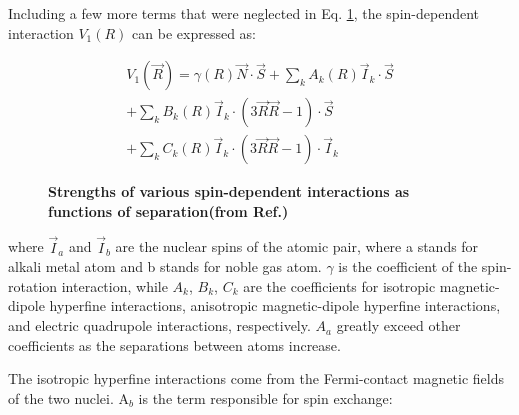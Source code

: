 Including a few more terms that were neglected in Eq. \ref{V1}, the spin-dependent interaction $V_{1}(R)$ can be expressed as:

\begin{equation}
\begin{split}
V_{1}(\vec{R})=\gamma(R)\vec{N}\cdot \vec{S}+\sum_{k}A_{k}(R)\vec{I}_{k}\cdot \vec{S}\\
+\sum_{k}B_{k}(R)\vec{I}_{k}\cdot (3\vec{R}\vec{R}-1)\cdot \vec{S}\\
+\sum_{k}C_{k}(R)\vec{I}_{k}\cdot (3\vec{R}\vec{R}-1)\cdot \vec{I}_{k}
\end{split}
\end{equation}

\begin{figure}[H]
	\centering
	\caption{{\bf Strengths of various spin-dependent interactions as functions of separation(from Ref.\@ \cite{WalkerHapper})}}
	\label{V1}
\end{figure}

where $\vec{I}_{a}$ and $\vec{I}_{b}$ are the nuclear spins of the atomic pair, where a stands for alkali metal atom and b stands for noble gas atom. $\gamma$ is the coefficient of the spin-rotation interaction, while $A_{k}$, $B_{k}$, $C_{k}$ are the coefficients for isotropic magnetic-dipole hyperfine interactions, anisotropic magnetic-dipole hyperfine interactions, and electric quadrupole interactions, respectively. $A_{a}$ greatly exceed other coefficients as the separations between atoms increase. 

The isotropic hyperfine interactions come from the Fermi-contact magnetic fields of the two nuclei. A$_{b}$ is the term responsible for spin exchange:

